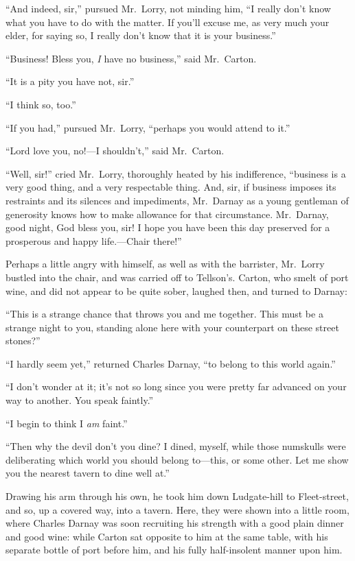 ``And indeed, sir,'' pursued Mr.\ Lorry, not minding him, ``I really
don't know what you have to do with the matter.  If you'll excuse me,
as very much your elder, for saying so, I really don't know that it is
your business.''

``Business!  Bless you, \emph{I} have no business,'' said Mr.\ Carton.

``It is a pity you have not, sir.''

``I think so, too.''

``If you had,'' pursued Mr.\ Lorry, ``perhaps you would attend to it.''

``Lord love you, no!---I shouldn't,'' said Mr.\ Carton.

``Well, sir!'' cried Mr.\ Lorry, thoroughly heated by his indifference,
``business is a very good thing, and a very respectable thing.  And, sir,
if business imposes its restraints and its silences and impediments,
Mr.\ Darnay as a young gentleman of generosity knows how to make allowance
for that circumstance.  Mr.\ Darnay, good night, God bless you, sir!
I hope you have been this day preserved for a prosperous and happy
life.---Chair there!''

Perhaps a little angry with himself, as well as with the barrister,
Mr.\ Lorry bustled into the chair, and was carried off to Tellson's.
Carton, who smelt of port wine, and did not appear to be quite sober,
laughed then, and turned to Darnay:

``This is a strange chance that throws you and me together.  This must
be a strange night to you, standing alone here with your counterpart
on these street stones?''

``I hardly seem yet,'' returned Charles Darnay, ``to belong to this world
again.''

``I don't wonder at it; it's not so long since you were pretty far
advanced on your way to another.  You speak faintly.''

``I begin to think I \emph{am} faint.''

``Then why the devil don't you dine?  I dined, myself, while those
numskulls were deliberating which world you should belong to---this,
or some other.  Let me show you the nearest tavern to dine well at.''

Drawing his arm through his own, he took him down Ludgate-hill to
Fleet-street, and so, up a covered way, into a tavern.  Here, they
were shown into a little room, where Charles Darnay was soon recruiting
his strength with a good plain dinner and good wine:  while Carton sat
opposite to him at the same table, with his separate bottle of port
before him, and his fully half-insolent manner upon him.

